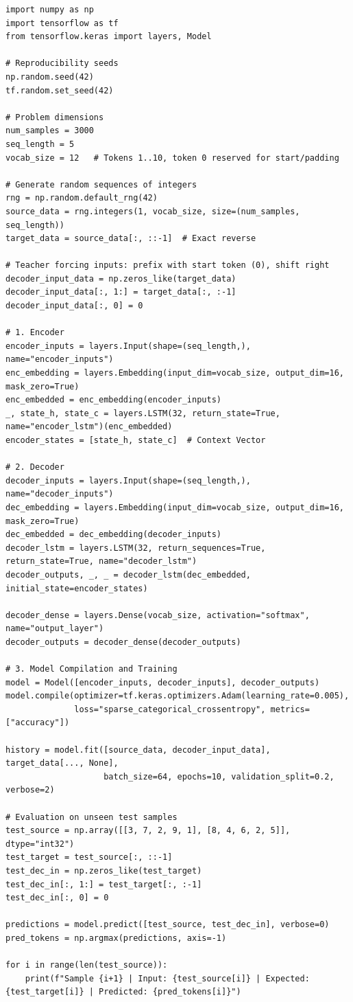\documentclass[12pt,a4paper]{article}
\begin{document}
\begin{lstlisting}
import numpy as np
import tensorflow as tf
from tensorflow.keras import layers, Model

# Reproducibility seeds
np.random.seed(42)
tf.random.set_seed(42)

# Problem dimensions
num_samples = 3000
seq_length = 5
vocab_size = 12   # Tokens 1..10, token 0 reserved for start/padding

# Generate random sequences of integers
rng = np.random.default_rng(42)
source_data = rng.integers(1, vocab_size, size=(num_samples, seq_length))
target_data = source_data[:, ::-1]  # Exact reverse

# Teacher forcing inputs: prefix with start token (0), shift right
decoder_input_data = np.zeros_like(target_data)
decoder_input_data[:, 1:] = target_data[:, :-1]
decoder_input_data[:, 0] = 0

# 1. Encoder
encoder_inputs = layers.Input(shape=(seq_length,), name="encoder_inputs")
enc_embedding = layers.Embedding(input_dim=vocab_size, output_dim=16, mask_zero=True)
enc_embedded = enc_embedding(encoder_inputs)
_, state_h, state_c = layers.LSTM(32, return_state=True, name="encoder_lstm")(enc_embedded)
encoder_states = [state_h, state_c]  # Context Vector

# 2. Decoder
decoder_inputs = layers.Input(shape=(seq_length,), name="decoder_inputs")
dec_embedding = layers.Embedding(input_dim=vocab_size, output_dim=16, mask_zero=True)
dec_embedded = dec_embedding(decoder_inputs)
decoder_lstm = layers.LSTM(32, return_sequences=True, return_state=True, name="decoder_lstm")
decoder_outputs, _, _ = decoder_lstm(dec_embedded, initial_state=encoder_states)

decoder_dense = layers.Dense(vocab_size, activation="softmax", name="output_layer")
decoder_outputs = decoder_dense(decoder_outputs)

# 3. Model Compilation and Training
model = Model([encoder_inputs, decoder_inputs], decoder_outputs)
model.compile(optimizer=tf.keras.optimizers.Adam(learning_rate=0.005),
              loss="sparse_categorical_crossentropy", metrics=["accuracy"])

history = model.fit([source_data, decoder_input_data], target_data[..., None],
                    batch_size=64, epochs=10, validation_split=0.2, verbose=2)

# Evaluation on unseen test samples
test_source = np.array([[3, 7, 2, 9, 1], [8, 4, 6, 2, 5]], dtype="int32")
test_target = test_source[:, ::-1]
test_dec_in = np.zeros_like(test_target)
test_dec_in[:, 1:] = test_target[:, :-1]
test_dec_in[:, 0] = 0

predictions = model.predict([test_source, test_dec_in], verbose=0)
pred_tokens = np.argmax(predictions, axis=-1)

for i in range(len(test_source)):
    print(f"Sample {i+1} | Input: {test_source[i]} | Expected: {test_target[i]} | Predicted: {pred_tokens[i]}")
\end{lstlisting}
\end{document}
